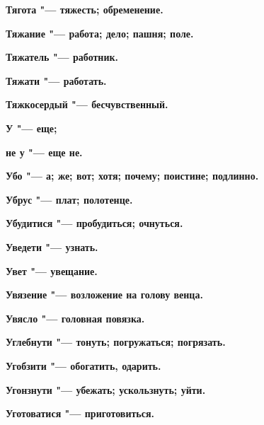 \bfseries Тягота \normalfont{} "--- тяжесть; обременение. 




\bfseries Тяжание \normalfont{} "--- работа; дело; пашня; поле. 




\bfseries Тяжатель \normalfont{} "--- работник. 




\bfseries Тяжати \normalfont{} "--- работать. 




\bfseries Тяжкосердый \normalfont{} "--- бесчувственный. 




 





\bfseries У \normalfont{} "--- еще; 




\bfseries не у \normalfont{} "--- еще не. 




\bfseries Убо \normalfont{} "--- а; же; вот; хотя; почему; поистине; подлинно. 




\bfseries Убрус \normalfont{} "--- плат; полотенце. 




\bfseries Убудитися \normalfont{} "--- пробудиться; очнуться. 




\bfseries Уведети \normalfont{} "--- узнать. 




\bfseries Увет \normalfont{} "--- увещание. 




\bfseries Увязение \normalfont{} "--- возложение на голову венца. 




\bfseries Увясло \normalfont{} "--- головная повязка. 




\bfseries Углебнути \normalfont{} "--- тонуть; погружаться; погрязать. 




\bfseries Угобзити \normalfont{} "--- обогатить, одарить. 




\bfseries Угонзнути \normalfont{} "--- убежать; ускользнуть; уйти. 




\bfseries Уготоватися \normalfont{} "--- приготовиться. 




